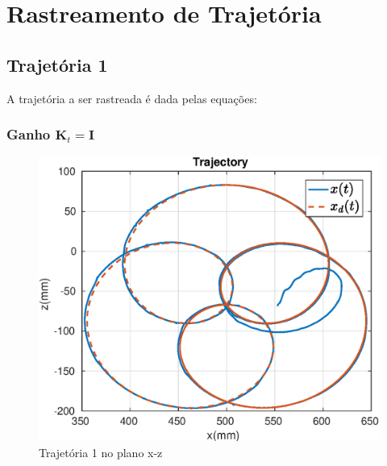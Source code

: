 \section{Rastreamento de Trajetória}

\subsection{Trajetória 1}
A trajetória a ser rastreada é dada pelas equações:


\subsubsection{Ganho $\bm{K}_t = \bm{I}$}

\begin{figure}[H]
\centering
  \includegraphics[width=0.5\linewidth]{./img/traj_1_k1/traj.eps}
  \caption{Trajetória 1 no plano x-z}
  \label{fig:sub1}
\end{figure}%

